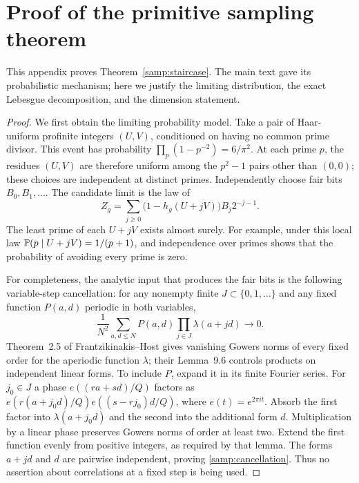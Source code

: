 \section{Proof of the primitive sampling theorem}
\label{samp:proofs}

This appendix proves Theorem~\ref{samp:staircase}.  The main text gave
its probabilistic mechanism; here we justify the limiting distribution,
the exact Lebesgue decomposition, and the dimension statement.

\begin{proof}
We first obtain the limiting probability model.  Take a pair of
Haar-uniform profinite integers $(U,V)$, conditioned on having no
common prime divisor.  This event has probability
$\prod_p(1-p^{-2})=6/\pi^2$.  At each prime $p$, the residues $(U,V)$
are therefore uniform among the $p^2-1$ pairs other than $(0,0)$;
these choices are independent at distinct primes.  Independently
choose fair bits $B_0,B_1,\ldots$.  The candidate limit is the law of
\begin{equation}
 Z_g=\sum_{j\ge0}\bigl(1-h_g(U+jV)\bigr)B_j2^{-j-1}.
 \label{samp:model}
\end{equation}
The least prime of each $U+jV$ exists almost surely.  For example,
under this local law
$\mathbb P(p\mid U+jV)=1/(p+1)$, and independence over primes shows
that the probability of avoiding every prime is zero.

For completeness, the analytic input that produces the fair bits
is the following variable-step cancellation: for any nonempty finite
$J\subset\{0,1,\ldots\}$ and any fixed function $P(a,d)$ periodic
in both variables,
\begin{equation}
 \frac1{N^2}\sum_{a,d\le N}P(a,d)
       \prod_{j\in J}\lambda(a+jd)\longrightarrow0.
 \label{samp:cancellation}
\end{equation}
Theorem~2.5 of Frantzikinakis--Host \cite{sampFrantzikinakisHost2017}
gives vanishing Gowers norms of every fixed order for the aperiodic
function $\lambda$; their Lemma~9.6 controls products on independent
linear forms.  To include $P$, expand it in its finite Fourier
series.  For $j_0\in J$ a phase $e((ra+sd)/Q)$ factors as
$e(r(a+j_0d)/Q)e((s-rj_0)d/Q)$, where $e(t)=e^{2\pi it}$.
Absorb the first factor into $\lambda(a+j_0d)$ and the second into
the additional form $d$.  Multiplication by a linear phase preserves
Gowers norms of order at least two.  Extend the first function evenly
from positive integers, as required by that lemma.  The forms
$a+jd$ and $d$ are pairwise independent, proving
\eqref{samp:cancellation}.  Thus no assertion about correlations
at a fixed step is being used.


\end{proof}
